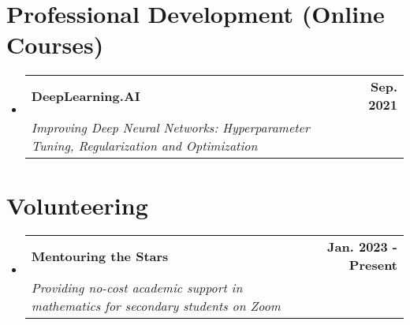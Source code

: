 \documentclass[letterpaper,11pt]{article}
\makeatletter
\newcommand{\resumeSubheading}[4]{
  \vspace{-2pt}\item
    \begin{tabular*}{1.0\textwidth}[t]{l@{\extracolsep{\fill}}r}
      \textbf{#1} & \textbf{\small #2} \\
      \textit{\small#3} & \textit{\small #4} \\
    \end{tabular*}\vspace{-7pt}
}
\newcommand{\resumeSubHeadingListStart}{\begin{itemize}[leftmargin=0.0in, label={}]}
\newcommand{\resumeSubHeadingListEnd}{\end{itemize}}
\makeatother
\begin{document}
\section{Professional Development (Online Courses)}
\resumeSubHeadingListStart
\resumeSubheading
{DeepLearning.AI}{Sep. 2021}{Improving Deep Neural Networks: Hyperparameter Tuning, Regularization and Optimization}{}
\resumeSubHeadingListEnd




\section{Volunteering}
\resumeSubHeadingListStart
\resumeSubheading{Mentouring the Stars}{Jan. 2023 - Present}{Providing no-cost academic support in mathematics for secondary students on Zoom}{}
\resumeSubHeadingListEnd
\end{document}
